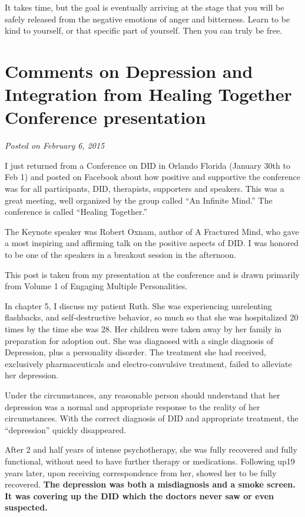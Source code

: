 \documentclass[]{book}
\begin{document}
It takes time, but the goal is eventually arriving at the stage that you will be safely released from the negative emotions of anger and bitterness. Learn to be kind to yourself, or that specific part of yourself. Then you can truly be free.

\hypertarget{comments-on-depression-and-integration-from-healing-together-conference-presentation}{%
\section{Comments on Depression and Integration from Healing Together Conference presentation}\label{comments-on-depression-and-integration-from-healing-together-conference-presentation}}

\emph{Posted on February 6, 2015}

I just returned from a Conference on DID in Orlando Florida (January 30th to Feb 1) and posted on Facebook about how positive and supportive the conference was for all participants, DID, therapists, supporters and speakers. This was a great meeting, well organized by the group called ``An Infinite Mind.'' The conference is called ``Healing Together.''

The Keynote speaker was Robert Oxnam, author of A Fractured Mind, who gave a most inspiring and affirming talk on the positive aspects of DID. I was honored to be one of the speakers in a breakout session in the afternoon.

This post is taken from my presentation at the conference and is drawn primarily from Volume 1 of Engaging Multiple Personalities.

In chapter 5, I discuss my patient Ruth. She was experiencing unrelenting flashbacks, and self-destructive behavior, so much so that she was hospitalized 20 times by the time she was 28. Her children were taken away by her family in preparation for adoption out. She was diagnosed with a single diagnosis of Depression, plus a personality disorder. The treatment she had received, exclusively pharmaceuticals and electro-convulsive treatment, failed to alleviate her depression.

Under the circumstances, any reasonable person should understand that her depression was a normal and appropriate response to the reality of her circumstances. With the correct diagnosis of DID and appropriate treatment, the ``depression'' quickly disappeared.

After 2 and half years of intense psychotherapy, she was fully recovered and fully functional, without need to have further therapy or medications. Following up19 years later, upon receiving correspondence from her, showed her to be fully recovered. \textbf{The depression was both a misdiagnosis and a smoke screen. It was covering up the DID which the doctors never saw or even suspected.}
\end{document}
